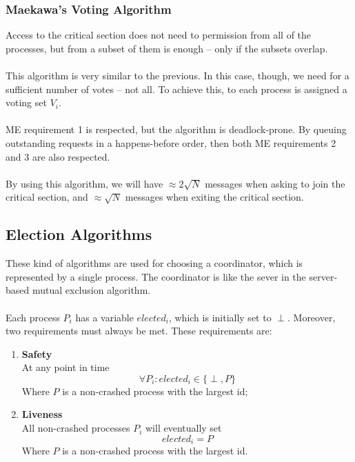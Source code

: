 \documentclass{article}
\begin{document}
\subsubsection{Maekawa's Voting Algorithm}
Access to the critical section does not need to permission from all of the processes, but from a subset of them is enough -- only if the subsets overlap. \\ \\
This algorithm is very similar to the previous. In this case, though, we need for a sufficient number of votes -- not all. To achieve this, to each process is assigned a voting set $V_i$. \\ \\
ME requirement 1 is respected, but the algorithm is deadlock-prone. By queuing outstanding requests in a happens-before order, then both ME requirements 2 and 3 are also respected. \\ \\
By using this algorithm, we will have $\approx 2 \sqrt{N}$ messages when asking to join the critical section, and $\approx\sqrt{N}$ messages when exiting the critical section.

\subsection{Election Algorithms}
These kind of algorithms are used for choosing a coordinator, which is represented by a single process. The coordinator is like the sever in the server-based mutual exclusion algorithm. \\ \\
Each process $P_i$ has a variable $elected_i$, which is initially set to $\perp$. Moreover, two requirements must always be met. These requirements are:
\begin{enumerate}
	\item \textbf{Safety} \\
	At any point in time
	\[ \forall P_i : elected_i \in \{ \perp, P \} \]
	Where $P$ is a non-crashed process with the largest id;
	\item \textbf{Liveness} \\
	All non-crashed processes $P_i$ will eventually set
	\[ elected_i = P \]
	Where $P$ is a non-crashed process with the largest id.
\end{enumerate}
\end{document}
